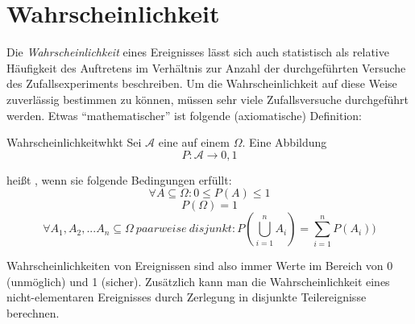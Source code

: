 \section{Wahrscheinlichkeit}

Die \emph{Wahrscheinlichkeit} eines Ereignisses lässt sich auch statistisch als
relative Häufigkeit des Auftretens im Verhältnis zur Anzahl der durchgeführten
Versuche des Zufallsexperiments beschreiben. Um die Wahrscheinlichkeit auf diese
Weise zuverlässig bestimmen zu können, müssen sehr viele Zufallsversuche
durchgeführt werden. Etwas "`mathematischer"' ist folgende (axiomatische)
Definition:

\begin{definition}{Wahrscheinlichkeit}{whkt}
Sei $\mathcal{A}$ eine  auf einem
 $\Omega$. Eine Abbildung
\[ P: \mathcal{A} \to 0,1 \]

heißt , wenn sie folgende Bedingungen erfüllt:
\[\forall A \subseteq \Omega: 0 \leq P(A) \leq 1\]
\[P(\Omega) = 1\]
\[\forall A_1, A_2, ... A_n \subseteq \Omega\ paarweise\ disjunkt:
P(\bigcup_{i=1}^{n} A_i) = \sum_{i=1}^{n}P(A_i))\]
\end{definition}

Wahrscheinlichkeiten von Ereignissen sind also immer Werte im Bereich von 0
(unmöglich) und 1 (sicher). Zusätzlich kann man die Wahrscheinlichkeit eines
nicht-elementaren Ereignisses durch Zerlegung in disjunkte Teilereignisse
berechnen.

